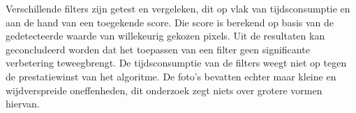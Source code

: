 Verschillende filters zijn getest en vergeleken, dit op vlak van tijdsconsumptie en aan de hand van een toegekende score. Die score is berekend op basis van de gedetecteerde waarde van willekeurig gekozen pixels. Uit de resultaten kan geconcludeerd worden dat het toepassen van een filter geen significante verbetering teweegbrengt. De tijdsconsumptie van de filters weegt niet op tegen de prestatiewinst van het algoritme. De foto's bevatten echter maar kleine en wijdverspreide oneffenheden, dit onderzoek zegt niets over grotere vormen hiervan.